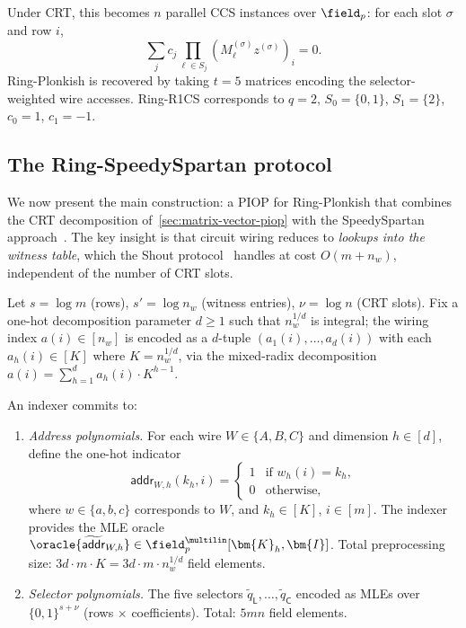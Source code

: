 Under CRT, this becomes $n$ parallel CCS instances over $\field_p$: for each slot $\sigma$ and row $i$,
\[
    \sum_{j} c_j \prod_{\ell \in S_j} (M_\ell^{(\sigma)} z^{(\sigma)})_i = 0.
\]
Ring-Plonkish is recovered by taking $t = 5$ matrices encoding the selector-weighted wire accesses.
Ring-R1CS corresponds to $q = 2$, $S_0 = \{0,1\}$, $S_1 = \{2\}$, $c_0 = 1$, $c_1 = -1$.


\subsection{The Ring-SpeedySpartan protocol}
\label{sec:ring-speedyspartan-protocol}

We now present the main construction: a PIOP for Ring-Plonkish that combines the CRT decomposition of~\cref{sec:matrix-vector-piop} with the SpeedySpartan approach~\cite{twist-and-shout}. The key insight is that circuit wiring reduces to \emph{lookups into the witness table}, which the Shout protocol~\cite{twist-and-shout} handles at cost $O(m + n_w)$, independent of the number of CRT slots.

Let $s = \log m$ (rows), $s' = \log n_w$ (witness entries), $\nu = \log n$ (CRT slots).
Fix a one-hot decomposition parameter $d \geq 1$ such that $n_w^{1/d}$ is integral; the wiring index $a(i) \in [n_w]$ is encoded as a $d$-tuple $(a_1(i), \ldots, a_d(i))$ with each $a_h(i) \in [K]$ where $K = n_w^{1/d}$, via the mixed-radix decomposition $a(i) = \sum_{h=1}^d a_h(i) \cdot K^{h-1}$.

An indexer commits to:
\begin{enumerate}
    \item \emph{Address polynomials.} For each wire $W \in \{A, B, C\}$ and dimension $h \in [d]$, define the one-hot indicator
    \[
        \mathsf{addr}_{W,h}(k_h, i) = \begin{cases} 1 & \text{if } w_h(i) = k_h, \\ 0 & \text{otherwise,} \end{cases}
    \]
    where $w \in \{a, b, c\}$ corresponds to $W$, and $k_h \in [K]$, $i \in [m]$.
    The indexer provides the MLE oracle $\oracle{\widetilde{\mathsf{addr}}_{W,h}} \in \field_p^{\multilin}[\bm{K}_h, \bm{I}]$.
    Total preprocessing size: $3d \cdot m \cdot K = 3d \cdot m \cdot n_w^{1/d}$ field elements.
    
    \item \emph{Selector polynomials.} The five selectors $\tilde{q}_\mathsf{L}, \ldots, \tilde{q}_\mathsf{C}$ encoded as MLEs over $\{0,1\}^{s+\nu}$ (rows $\times$ coefficients).
    Total: $5mn$ field elements.
\end{enumerate}

